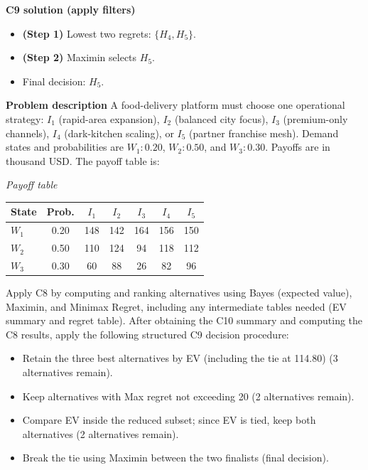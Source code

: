 \begin{ExamProblems}
		\textbf{C9 solution (apply filters)}\par
		\begin{itemize}
			\item \textbf{(Step 1)} Lowest two regrets: $\{H_4,H_5\}$.
			\item \textbf{(Step 2)} Maximin selects $H_5$.
			\item Final decision: $H_5$.
		\end{itemize}
		
		\newpage
		\item
		\textbf{Problem description}
		A food-delivery platform must choose one operational strategy: $I_1$ (rapid-area expansion), $I_2$ (balanced city focus), $I_3$ (premium-only channels), $I_4$ (dark-kitchen scaling), or $I_5$ (partner franchise mesh).
		Demand states and probabilities are $W_1:0.20$, $W_2:0.50$, and $W_3:0.30$. Payoffs are in thousand USD. The payoff table is:
		
		\begin{center}
			\textit{Payoff table} \\
			\begin{tabular}{l c c c c c c}
				\hline
				State& Prob. & $I_1$ & $I_2$ & $I_3$ & $I_4$ & $I_5$ \\
				\hline
				$W_1$ & 0.20 & 148 & 142 & 164 & 156 & 150 \\
				$W_2$ & 0.50 & 110 & 124 & 94 & 118 & 112 \\
				$W_3$ & 0.30 & 60 & 88 & 26 & 82 & 96 \\
				\hline
			\end{tabular}
		\end{center}
		
		Apply C8 by computing and ranking alternatives using Bayes (expected value), Maximin, and Minimax Regret, including any intermediate tables needed (EV summary and regret table).
		After obtaining the C10 summary and computing the C8 results, apply the following structured C9 decision procedure:
		\begin{itemize}
			\item Retain the three best alternatives by EV (including the tie at 114.80) (3 alternatives remain).
			\item Keep alternatives with Max regret not exceeding 20 (2 alternatives remain).
			\item Compare EV inside the reduced subset; since EV is tied, keep both alternatives (2 alternatives remain).
			\item Break the tie using Maximin between the two finalists (final decision).
		\end{itemize}
		

\end{ExamProblems}
